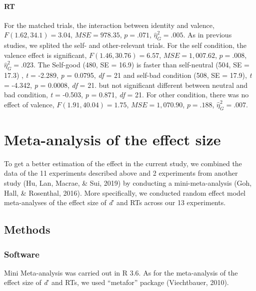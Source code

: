 \documentclass[man]{apa6}
\let\oldparagraph\paragraph
\renewcommand{\paragraph}[1]{\oldparagraph{#1}\mbox{}}
\begin{document}
\hypertarget{rt-1}{%
\paragraph{RT}\label{rt-1}}

For the matched trials, the interaction between identity and valence, \(F(1.62, 34.1) = 3.04\), \(\mathit{MSE} = 978.35\), \(p = .071\), \(\hat{\eta}^2_G = .005\). As in previous studies, we splited the self- and other-relevant trials. For the self condition, the valence effect is significant, \(F(1.46, 30.76) = 6.57\), \(\mathit{MSE} = 1,007.62\), \(p = .008\), \(\hat{\eta}^2_G = .023\). The Self-good (480, SE = 16.9) is faster than self-neutral (504, SE = 17.3) , \emph{t} = -2.289, \emph{p} = 0.0795, \emph{df} = 21 and self-bad condition (508, SE = 17.9), \emph{t} = -4.342, \emph{p} = 0.0008, \emph{df} = 21. but not significant different between neutral and bad condition, \emph{t} = -0.503, \emph{p} = 0.871, \emph{df} = 21. For other condition, there was no effect of valence, \(F(1.91, 40.04) = 1.75\), \(\mathit{MSE} = 1,070.90\), \(p = .188\), \(\hat{\eta}^2_G = .007\).

\newpage

\hypertarget{meta-analysis-of-the-effect-size}{%
\section{Meta-analysis of the effect size}\label{meta-analysis-of-the-effect-size}}

To get a better estimation of the effect in the current study, we combined the data of the 11 experiments described above and 2 experiments from another study (Hu, Lan, Macrae, \& Sui, 2019) by conducting a mini-meta-analysis (Goh, Hall, \& Rosenthal, 2016). More specifically, we conducted random effect model meta-analyses of the effect size of \emph{d}' and RTs across our 13 experiments.

\hypertarget{methods-2}{%
\subsection{Methods}\label{methods-2}}

\hypertarget{software}{%
\subsubsection{Software}\label{software}}

Mini Meta-analysis was carried out in R 3.6. As for the meta-analysis of the effect size of \emph{d}' and RTs, we used \enquote{metafor} package (Viechtbauer, 2010).
\end{document}
